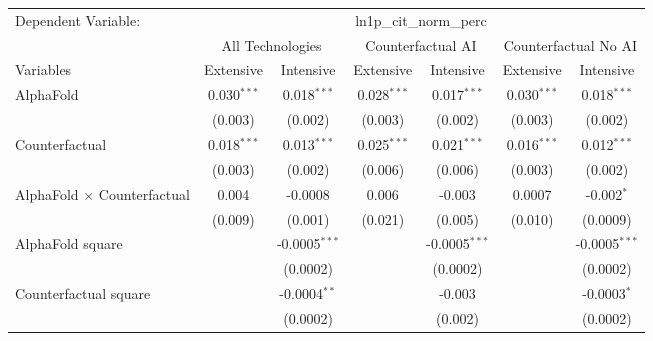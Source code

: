 \begingroup
\centering
\begin{tabular}{lcccccc}
   \tabularnewline \midrule \midrule
   Dependent Variable: & \multicolumn{6}{c}{ln1p\_cit\_norm\_perc}\\
 & \multicolumn{2}{c}{All Technologies} & \multicolumn{2}{c}{Counterfactual AI} & \multicolumn{2}{c}{Counterfactual No AI} \\
\cmidrule(lr){1-1}\cmidrule(lr){2-3} \cmidrule(lr){4-5} \cmidrule(lr){6-7}
Variables & \multicolumn{1}{c}{Extensive} & \multicolumn{1}{c}{Intensive} & \multicolumn{1}{c}{Extensive} & \multicolumn{1}{c}{Intensive} & \multicolumn{1}{c}{Extensive} & \multicolumn{1}{c}{Intensive} \\
\cmidrule(lr){1-1}\cmidrule(lr){2-2} \cmidrule(lr){3-3} \cmidrule(lr){4-4} \cmidrule(lr){5-5} \cmidrule(lr){6-6} \cmidrule(lr){7-7}
   AlphaFold                          & 0.030$^{***}$ & 0.018$^{***}$   & 0.028$^{***}$ & 0.017$^{***}$   & 0.030$^{***}$ & 0.018$^{***}$\\   
                                      & (0.003)       & (0.002)         & (0.003)       & (0.002)         & (0.003)       & (0.002)\\   
   Counterfactual                     & 0.018$^{***}$ & 0.013$^{***}$   & 0.025$^{***}$ & 0.021$^{***}$   & 0.016$^{***}$ & 0.012$^{***}$\\   
                                      & (0.003)       & (0.002)         & (0.006)       & (0.006)         & (0.003)       & (0.002)\\   
   AlphaFold $\times$ Counterfactual  & 0.004         & -0.0008         & 0.006         & -0.003          & 0.0007        & -0.002$^{*}$\\   
                                      & (0.009)       & (0.001)         & (0.021)       & (0.005)         & (0.010)       & (0.0009)\\   
   AlphaFold square                   &               & -0.0005$^{***}$ &               & -0.0005$^{***}$ &               & -0.0005$^{***}$\\   
                                      &               & (0.0002)        &               & (0.0002)        &               & (0.0002)\\   
   Counterfactual square              &               & -0.0004$^{**}$  &               & -0.003          &               & -0.0003$^{*}$\\   
                                      &               & (0.0002)        &               & (0.002)         &               & (0.0002)\\   

\end{tabular}
